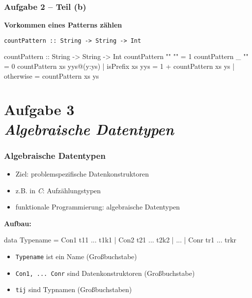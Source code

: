\documentclass{beamer}
\begin{document}
\begin{frame}[t, fragile] \frametitle{Aufgabe 2 -- Teil (b)}
	\textbf{Vorkommen eines Patterns zählen}
	
	\texttt{countPattern :: String -> String -> Int}
	
	\pause\bigskip

	\begin{codebox}
countPattern :: String -> String -> Int
countPattern "" "" = 1
countPattern _  "" = 0
countPattern xs yys@(y:ys)
	| isPrefix xs yys = 1 + countPattern xs ys
	| otherwise       = countPattern xs ys
	\end{codebox}
\end{frame}


\section{Aufgabe 3 \\ \textit{\normalsize Algebraische Datentypen}}

\begin{frame}[fragile] \frametitle{Algebraische Datentypen}
	\footnotesize
	\begin{itemize}
		\item Ziel: problemspezifische Datenkonstruktoren
		\item z.B. in \textit{C}: Aufzählungstypen
		\item funktionale Programmierung: algebraische Datentypen
	\end{itemize}

	\textbf{Aufbau:}
	\begin{codebox}
data Typename 
	= Con1 t11 ... t1k1
	| Con2 t21 ... t2k2
	| ...
	| Conr tr1 ... trkr
	\end{codebox}
	\begin{itemize}
		\item \texttt{Typename} ist ein Name (Großbuchstabe)
		\item \texttt{Con1, ... Conr} sind Datenkonstruktoren (Großbuchstabe)
		\item \texttt{tij} sind Typnamen (Großbuchstaben)
	\end{itemize}
\end{frame}
\end{document}
